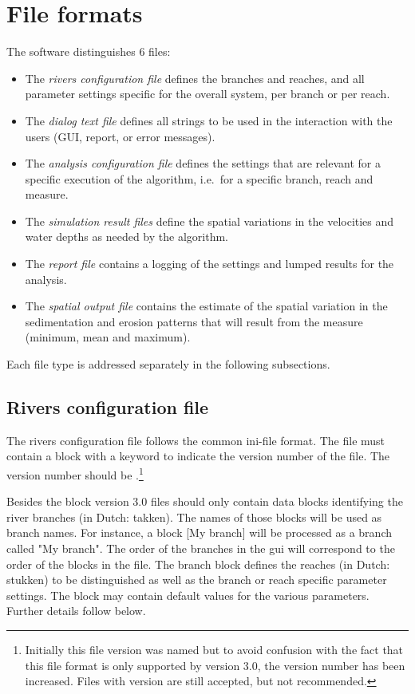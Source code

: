 \chapter{File formats}

The software distinguishes 6 files:

\begin{itemize}
\item The \emph{rivers configuration file} defines the branches and reaches, and all parameter settings specific for the overall system, per branch or per reach.
\item The \emph{dialog text file} defines all strings to be used in the interaction with the users (GUI, report, or error messages).
\item The \emph{analysis configuration file} defines the settings that are relevant for a specific execution of the algorithm, i.e.~for a specific branch, reach and measure.
\item The \emph{simulation result files} define the spatial variations in the velocities and water depths as needed by the algorithm.
\item The \emph{report file} contains a logging of the settings and lumped results for the analysis.
\item The \emph{spatial output file} contains the estimate of the spatial variation in the sedimentation and erosion patterns that will result from the measure (minimum, mean and maximum).
\end{itemize}

Each file type is addressed separately in the following subsections.

\section{Rivers configuration file}

The rivers configuration file follows the common ini-file format.
The file must contain a \keyw{[General]} block with a keyword  to indicate the version number of the file.
The version number should be .\footnote{Initially this file version was named  but to avoid confusion with the fact that this file format is only supported by \dfastmi version 3.0, the version number has been increased.
Files with version  are still accepted, but not recommended.}

Besides the \keyw{[General]} block version 3.0 files should only contain data blocks identifying the river branches (in Dutch: takken).
The names of those blocks will be used as branch names.
For instance, a block [My branch] will be processed as a branch called "My branch".
The order of the branches in the gui will correspond to the order of the blocks in the file.
The branch block defines the reaches (in Dutch: stukken) to be distinguished as well as the branch or reach specific parameter settings.
The \keyw{[General]} block may contain default values for the various parameters.
Further details follow below.

